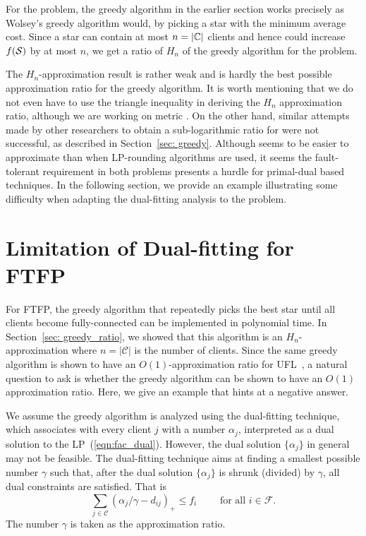 \documentclass[oneside,final]{ucr}
\begin{document}
For the {\FTFP} problem, the greedy algorithm in the earlier
section works precisely as Wolsey's greedy algorithm would,
by picking a star with the minimum average cost. Since a
star can contain at most $n=|\mathbb{C}|$ clients and hence
could increase $f(\calS)$ by at most $n$, we get a ratio of
$H_n$ of the greedy algorithm for the {\FTFP} problem.

The $H_n$-approximation result is rather weak and is hardly
the best possible approximation ratio for the greedy
algorithm. It is worth mentioning that we do not even have
to use the triangle inequality in deriving the $H_n$
approximation ratio, although we are working on metric
{\FTFP}. On the other hand, similar attempts made by other
researchers to obtain a sub-logarithmic ratio for {\FTFL}
were not successful, as described in Section~\ref{sec:
  greedy}. Although {\FTFP} seems to be easier to
approximate than {\FTFL} when LP-rounding algorithms are
used, it seems the fault-tolerant requirement in both
problems presents a hurdle for primal-dual based
techniques. In the following section, we provide an example
illustrating some difficulty when adapting the dual-fitting
analysis to the {\FTFP} problem.

\section{Limitation of Dual-fitting for FTFP}
\label{sec: greedy_example}
For FTFP, the greedy algorithm that repeatedly picks the
best star until all clients become fully-connected can be
implemented in polynomial time. In Section~\ref{sec:
  greedy_ratio}, we showed that this algorithm is an
$H_n$-approximation where $n=|\mathcal C|$ is the number of
clients. Since the same greedy algorithm is shown to have an
$O(1)$-approximation ratio for UFL~\cite{MahdianMSV01}, a
natural question to ask is whether the greedy algorithm can
be shown to have an $O(1)$ approximation ratio. Here, we
give an example that hints at a negative answer.

We assume the greedy algorithm is analyzed using the
dual-fitting technique, which associates with every client
$j$ with a number $\alpha_j$, interpreted as a dual solution
to the LP~(\ref{eqn:fac_dual}). However, the dual solution
$\{\alpha_j\}$ in general may not be feasible. The
dual-fitting technique aims at finding a smallest possible
number $\gamma$ such that, after the dual solution
$\{\alpha_j\}$ is shrunk (divided) by $\gamma$, all dual
constraints are satisfied. That is
\begin{equation*}
\sum_{j\in \mathcal C} (\alpha_j/\gamma
- d_{ij})_+ \leq f_i \qquad \text{ for all } i\in \mathcal F. 
\end{equation*}
The number $\gamma$ is taken as the approximation ratio.
\end{document}
